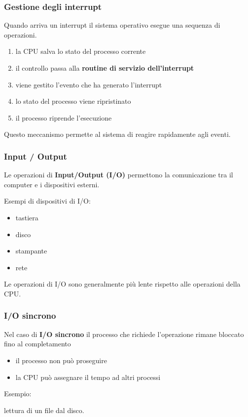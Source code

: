 \documentclass{beamer}
\begin{document}

\begin{frame}
	\frametitle{Gestione degli interrupt}
	
	Quando arriva un interrupt il sistema operativo esegue
	una sequenza di operazioni.
	
	\begin{enumerate}
		\item la CPU salva lo stato del processo corrente
		\item il controllo passa alla \textbf{routine di servizio dell'interrupt}
		\item viene gestito l'evento che ha generato l'interrupt
		\item lo stato del processo viene ripristinato
		\item il processo riprende l'esecuzione
	\end{enumerate}
	
	Questo meccanismo permette al sistema di reagire
	rapidamente agli eventi.
	
\end{frame}


\begin{frame}
	\frametitle{Input / Output}
	
	Le operazioni di \textbf{Input/Output (I/O)} permettono
	la comunicazione tra il computer e i dispositivi esterni.
	
	Esempi di dispositivi di I/O:
	
	\begin{itemize}
		\item tastiera
		\item disco
		\item stampante
		\item rete
	\end{itemize}
	
	Le operazioni di I/O sono generalmente più lente
	rispetto alle operazioni della CPU.
	
\end{frame}


\begin{frame}
	\frametitle{I/O sincrono}
	
	Nel caso di \textbf{I/O sincrono} il processo che richiede
	l'operazione rimane bloccato fino al completamento
	
	\begin{itemize}
		\item il processo non può proseguire
		\item la CPU può assegnare il tempo ad altri processi
	\end{itemize}
	
	Esempio:
	
	lettura di un file dal disco.
	
\end{frame}
\end{document}
